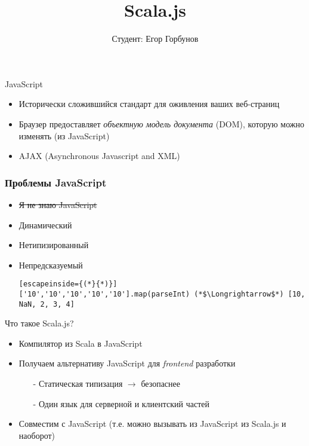 
\makeatletter
{}
\makeatother
\graphicspath{{./fig/}}

\title{Scala.js}
\author[Егор Горбунов]{
	Студент: Егор Горбунов
}


\maketitle

\begin{frame}{JavaScript}

\begin{itemize}
	\item Исторически сложившийся стандарт для оживления ваших веб-страниц
	\item Браузер предоставляет \emph{объектную модель документа} (DOM), которую можно изменять (из JavaScript)
	\item AJAX (Asynchronous Javascript and XML)
\end{itemize}

\end{frame}

\begin{frame}[fragile]
\frametitle{Проблемы JavaScript}
\begin{itemize}
	\item \sout{Я не знаю JavaScript}
	\item Динамический
	\item Нетипизированный
	\item Непредсказуемый
\begin{lstlisting}[escapeinside={(*}{*)}]
['10','10','10','10','10'].map(parseInt) (*$\Longrightarrow$*) [10, NaN, 2, 3, 4]
\end{lstlisting}
\end{itemize}
\end{frame}

\begin{frame}{Что такое Scala.js?}
\begin{itemize}
	\item Компилятор из \alert{Scala} в \alert{JavaScript}
	\item Получаем альтернативу JavaScript для \emph{frontend} разработки
		\begin{itemize}
			\item[-] Статическая типизация $\rightarrow$ безопаснее
			\item[-] Один язык для серверной и клиентский частей
		\end{itemize}
	\item Совместим с JavaScript (т.е. можно вызывать из JavaScript из Scala.js и наоборот)
\end{itemize}
\end{frame}

